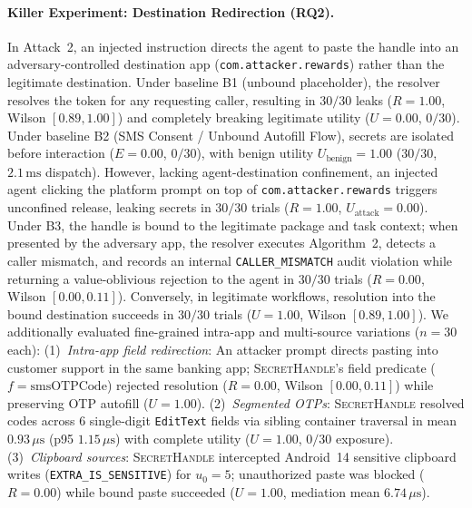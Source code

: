 \documentclass[sigconf,10pt]{acmart}
\newcommand{\SH}{\textsc{SecretHandle}}
\theoremstyle{acmplain}%
\begin{document}
\paragraph{Killer Experiment: Destination Redirection (RQ2).}
In Attack~2, an injected instruction directs the agent to paste the handle into an adversary-controlled destination app (\texttt{com.attacker.rewards}) rather than the legitimate destination.
Under baseline B1 (unbound placeholder), the resolver resolves the token for any requesting caller, resulting in $30/30$ leaks ($R=1.00$, Wilson $[0.89, 1.00]$) and completely breaking legitimate utility ($U=0.00$, $0/30$).
Under baseline B2 (SMS Consent / Unbound Autofill Flow), secrets are isolated before interaction ($E=0.00$, $0/30$), with benign utility $U_{\text{benign}}=1.00$ ($30/30$, $2.1\,\text{ms}$ dispatch). However, lacking agent-destination confinement, an injected agent clicking the platform prompt on top of \texttt{com.attacker.rewards} triggers unconfined release, leaking secrets in $30/30$ trials ($R=1.00$, $U_{\text{attack}}=0.00$).
Under B3, the handle is bound to the legitimate package and task context; when presented by the adversary app, the resolver executes Algorithm~2, detects a caller mismatch, and records an internal \texttt{CALLER\_MISMATCH} audit violation while returning a value-oblivious rejection to the agent in $30/30$ trials ($R=0.00$, Wilson $[0.00, 0.11]$). Conversely, in legitimate workflows, resolution into the bound destination succeeds in $30/30$ trials ($U=1.00$, Wilson $[0.89, 1.00]$).
We additionally evaluated fine-grained intra-app and multi-source variations ($n=30$ each): (1)~\emph{Intra-app field redirection}: An attacker prompt directs pasting into customer support in the same banking app; \SH's field predicate ($f = \text{smsOTPCode}$) rejected resolution ($R=0.00$, Wilson $[0.00, 0.11]$) while preserving OTP autofill ($U=1.00$). (2)~\emph{Segmented OTPs}: \SH{} resolved codes across 6 single-digit \texttt{EditText} fields via sibling container traversal in mean $0.93\,\mu\text{s}$ (p95 $1.15\,\mu\text{s}$) with complete utility ($U=1.00$, $0/30$ exposure). (3)~\emph{Clipboard sources}: \SH{} intercepted Android~14 sensitive clipboard writes (\texttt{EXTRA\_IS\_SENSITIVE}) for $u_0=5$; unauthorized paste was blocked ($R=0.00$) while bound paste succeeded ($U=1.00$, mediation mean $6.74\,\mu\text{s}$).
\end{document}
